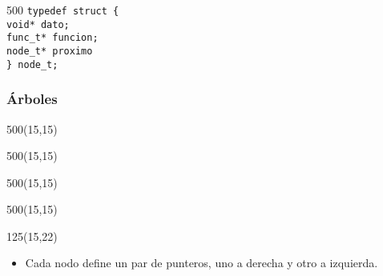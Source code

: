 \documentclass[aspectratio=169]{beamer}
\begin{document}
\begin{frame}
\begin{textblock}{500}
{    \small
    \hspace{1cm}\textcolor{verdeuca}{\texttt{typedef struct \{}}\\
    \hspace{2cm}\textcolor{naranjauca}{\texttt{void* dato;}}\\
    \hspace{2cm}\textcolor{naranjauca}{\texttt{func\_t* funcion;}}\\
    \hspace{2cm}\textcolor{verdeuca}{\texttt{node\_t* proximo}}\\
    \hspace{1cm}\textcolor{verdeuca}{\texttt{\} node\_t;}}
    } \end{textblock}
\end{frame}

\begin{frame}
    \frametitle{Árboles}
    \begin{textblock}{500}(15,15)  \end{textblock}
    \begin{textblock}{500}(15,15)  \end{textblock}
    \begin{textblock}{500}(15,15)  \end{textblock}
    \begin{textblock}{500}(15,15)  \end{textblock}
    \begin{textblock}{125}(15,22) 
    \begin{itemize}
    \setlength\itemsep{0.4cm}
     \item<1-3>[-] Cada nodo define un par de punteros, uno a derecha y otro a izquierda.

\end{itemize}
\end{textblock}
\end{frame}
\end{document}
